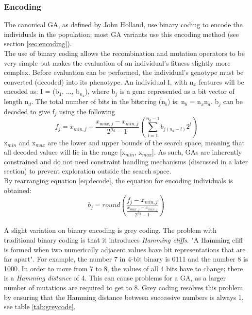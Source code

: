 \subsubsection{Encoding}
The canonical GA, as defined by John Holland, use binary coding to encode the individuals in the population; most GA variants use this encoding method (see section \ref{sec:encoding}).
\\The use of binary coding allows the recombination and mutation operators to be very simple but makes the evaluation of an individual's fitness slightly more complex. Before evaluation can be performed, the individual's genotype must be converted (decoded) into its phenotype. An individual I, with n$_{x}$ features will be encoded as: I = (b$_{1}$, ..., b$_{n_{x}}$), where b$_{j}$ is a gene represented as a bit vector of length n$_{d}$. The total number of bits in the bitstring (n$_{b}$) is: n$_{b}$ = n$_{x}$n$_{d}$. b$_{j}$ can be decoded to give f$_{j}$ using the following\cite{4-en}
\begin{equation}
\label{eq:decode}
  f_{j} = x_{min, j} + \frac{x_{max, j} - x_{min, j}}{2^{n_{d}} - 1}(\sum_{l=1}^{n_{d}-1}{b_{j(n_{d}-l)}2^{l}})
\end{equation}
x$_{min}$ and x$_{max}$ are the lower and upper bounds of the search space, meaning that all decoded values will lie in the range [x$_{min}$, x$_{max}$]. As such, GAs are inherently constrained and do not need constraint handling mechanisms (discussed in a later section) to prevent exploration outside the search space.
\\By rearranging equation \ref{eq:decode}, the equation for encoding individuals is obtained:
\begin{equation}
  b_{j} = round(\frac{f_{j} - x_{min, j}}{\frac{x_{max, j} - x_{min, j}}{2^{n_{d}} - 1}})
\end{equation}
\\A slight variation on binary encoding is grey coding. The problem with traditional binary coding is that it introduces \emph{Hamming cliffs}. "A Hamming cliff is formed when two numerically adjacent values have bit representations that are far apart"\cite{4-en}. For example, the number 7 in 4-bit binary is 0111 and the number 8 is 1000. In order to move from 7 to 8, the values of all 4 bits have to change; there is a \emph{Hamming distance} of 4. This can cause problems for a GA, as a larger number of mutations are required to get to 8. Grey coding resolves this problem by ensuring that the Hamming distance between successive numbers is always 1, see table \ref{tab:greycode}.

